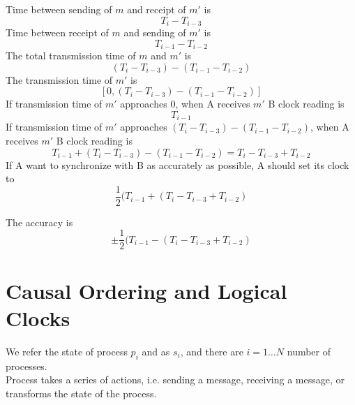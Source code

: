 \begin{multicols*}{2}
\begin{center}
\end{center}

\noindent Time between sending of $m$ and receipt of $m'$ is $$T_i - T_{i-3}$$
\noindent Time between receipt of $m$ and sending of $m'$ is $$T_{i-1} - T_{i-2}$$
\noindent The total transmission time of $m$ and $m'$ is $$(T_i - T_{i-3}) - (T_{i-1} - T_{i-2})$$
\noindent The transmission time of $m'$ is $$[0,(T_i - T_{i-3}) - (T_{i-1} - T_{i-2})]$$
\noindent If transmission time of $m'$ approaches $0$, when A receives $m'$ B clock reading is $$T_{i-1}$$
\noindent If transmission time of $m'$ approaches $(T_i - T_{i-3}) - (T_{i-1} - T_{i-2})$, when A receives $m'$ B clock reading is $$T_{i-1} + (T_i - T_{i-3}) - (T_{i-1} - T_{i-2}) = T_i - T_{i-3} + T_{i-2}$$
\noindent If A want to synchronize with B as accurately as possible, A should set its clock to $$\frac{1}{2}(T_{i-1} + (T_i - T_{i-3} + T_{i-2})$$

\noindent The accuracy is $$\pm \frac{1}{2}(T_{i-1} - (T_i - T_{i-3} + T_{i-2})$$

\section{Causal Ordering and Logical Clocks}

\noindent We refer the state of process $p_i$ and as $s_i$, and there are $i=1\ldots N$ number of processes.\\

\noindent Process takes a series of actions, i.e. sending a message, receiving a message, or transforms the state of the process.\\


\end{multicols*}
